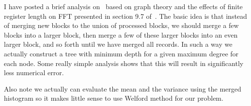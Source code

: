 \documentclass{article}
\begin{document}
I have posted a brief analysis on~\cite{ErrorAnalysis} based on graph theory and the effects of finite register length on FFT presented in section 9.7 of~\cite{oppenheim2006discrete}. The basic idea is that instead of merging new blocks to the union of processed blocks, we should merge a few blocks into a larger block, then merge a few of these larger blocks into an even larger block, and so forth until we have merged all records. In such a way we actually construct a tree with minimum depth for a given maximum degree for each node. Some really simple analysis shows that this will result in significantly less numerical error.

Also note we actually can evaluate the mean and the variance using the merged histogram so it makes little sense to use Welford method for our problem.
\end{document}
